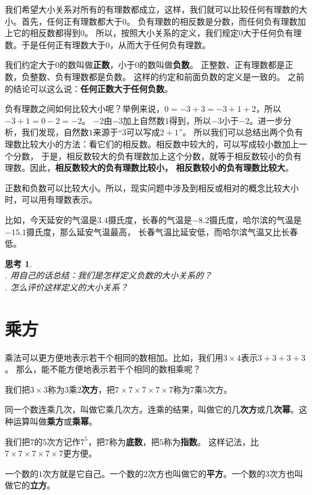 \documentclass[12pt,UTF8]{ctexbook}
\theoremstyle{definition}
\theoremstyle{plain}
\newtheorem{sk}{思考}[section]
\begin{document}
我们希望大小关系对所有的有理数都成立，这样，我们就可以比较任何有理数的大小。首先，任何正有理数都大于$0$。
负有理数的相反数是分数，而任何负有理数加上它的相反数都得到$0$。
所以，按照大小关系的定义，我们规定$0$大于任何负有理数。于是任何正有理数大于$0$，从而大于任何负有理数。

我们约定大于$0$的数叫做\textbf{正数}，小于$0$的数叫做\textbf{负数}。
正整数、正有理数都是正数，负整数、负有理数都是负数。
这样的约定和前面负数的定义是一致的。
之前的结论可以这么说：\textbf{任何正数大于任何负数}。

负有理数之间如何比较大小呢？举例来说，$0 = -3 + 3 = -3 + 1 + 2$，所以$-3 + 1 = 0 - 2 = -2$。
$-2$由$-3$加上自然数$1$得到，所以$-3$小于$-2$。进一步分析，我们发现，自然数$1$来源于“$3$可以写成$2+1$”。
所以我们可以总结出两个负有理数比较大小的方法：看它们的相反数。相反数中较大的，可以写成较小数加上一个分数，
于是，相反数较大的负有理数加上这个分数，就等于相反数较小的负有理数。因此，\textbf{相反数较大的负有理数比较小，
相反数较小的负有理数比较大}。

正数和负数可以比较大小。所以，现实问题中涉及到相反或相对的概念比较大小时，可以用有理数表示。

比如，今天延安的气温是$3.4$摄氏度，长春的气温是$-8.2$摄氏度，哈尔滨的气温是$-15.1$摄氏度，那么延安气温最高，
长春气温比延安低，而哈尔滨气温又比长春低。

\begin{sk}\label{sk:0-1-0}
    \mbox{}\\
    . 用自己的话总结：我们是怎样定义负数的大小关系的？\\
    . 怎么评价这样定义的大小关系？
\end{sk}

\section{乘方}
乘法可以更方便地表示若干个相同的数相加。比如，我们用$3 \times 4$表示$3+3+3+3$。
那么，能不能方便地表示若干个相同的数相乘呢？

我们把$3\times 3$称为$3$乘$2$\textbf{次方}，把$7\times 7\times 7\times 7\times 7$称为$7$乘$5$次方。

同一个数连乘几次，叫做它乘几次方。连乘的结果，叫做它的几\textbf{次方}或几\textbf{次幂}。这种运算叫做\textbf{乘方}或\textbf{乘幂}。

我们把$7$的$5$次方记作$7^5$，把$7$称为\textbf{底数}，把$5$称为\textbf{指数}。
这样记法，比$7\times 7\times 7\times 7\times 7$更方便。

一个数的$1$次方就是它自己。一个数的$2$次方也叫做它的\textbf{平方}。一个数的$3$次方也叫做它的\textbf{立方}。
\end{document}
